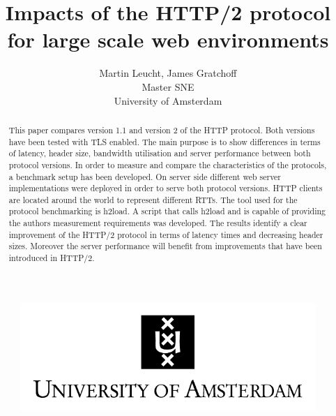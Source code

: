 \documentclass[10pt]{article}
\begin{document}
 
\begin{figure}[!bh]
 	\begin{center}
 	 
 		\huge \title{Impacts of the HTTP/2 protocol for large scale web environments}
		\author{Martin Leucht, James Gratchoff \\
		Master SNE \\ University of Amsterdam} 
		\includegraphics{images/uva.jpeg}
	\maketitle 
		\label{sec:uva}
	\end{center}
\end{figure}
\setlength{\columnsep}{2cm}
\def\columnseprulecolor{\color{blue}}
 
\newpage
\begin{abstract}
This paper compares version 1.1 and version 2 of the HTTP protocol. Both versions have been tested with TLS enabled. The main purpose is to show differences in terms of latency, header size, bandwidth utilisation and server performance between both protocol versions. In order to measure and compare the characteristics of the protocols, a benchmark setup has been developed. On server side different web server implementations were deployed in order to serve both protocol versions. HTTP clients are located around the world to represent different RTTs. The tool used for the protocol benchmarking is h2load. A script that calls h2load and is capable of providing the authors measurement requirements was developed. The results identify a clear improvement of the HTTP/2 protocol in terms of latency times and decreasing header sizes. Moreover the server performance will benefit from improvements that have been introduced in HTTP/2.
\end{abstract}

\newpage
\tableofcontents

\newpage
\newpage







\newpage




\newpage

\newpage

\newpage

\newpage

\end{document}
